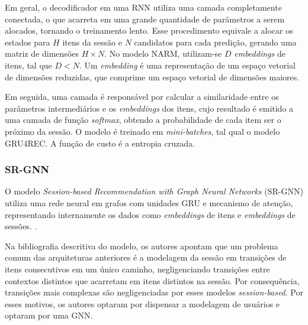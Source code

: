 Em geral, o decodificador em uma RNN utiliza uma camada completamente conectada,
o que acarreta em uma grande quantidade de parâmetros a serem alocados, tornando
o treinamento lento. Esse procedimento equivale a alocar os estados para $H$
itens da sessão e $N$ candidatos para cada predição, gerando uma matriz de
dimensões ${H \times N}$. No modelo NARM, utilizam-se $D$ \textit{embeddings} de
itens, tal que $D < N$. Um \textit{embedding} é uma representação de um espaço
vetorial de dimensões reduzidas, que comprime um espaço vetorial de dimensões
maiores.

Em seguida, uma camada é responsável por calcular a
similaridade entre os parâmetros intermediários e os \textit{embeddings} dos
itens, cujo resultado é emitido a uma camada de função \textit{softmax}, obtendo
a probabilidade de cada item ser o próximo da sessão. O modelo é treinado em \textit{mini-batches}, tal qual o modelo GRU4REC. A
função de custo é a entropia cruzada.


\subsubsection{SR-GNN}
O modelo \textit{Session-based Recommendation with Graph Neural Networks}
(SR-GNN) utiliza uma rede neural em grafos com unidades GRU e mecanismo de
atenção, representando internamente os dados como \textit{embeddings} de itens
e \textit{embeddings} de sessões. \cite{gnn}.

Na bibliografia descritiva do modelo, os autores apontam que um problema comum das arquiteturas anteriores é a modelagem da sessão em transições
de itens consecutivos em um único caminho, negligenciando transições entre
contextos distintos que acarretam em itens distintos na sessão. Por
consequência, transições mais complexas são negligenciadas por esses modelos
\textit{session-based}. Por esses motivos, os autores optaram por dispensar a
modelagem de usuários e optaram por uma GNN.

